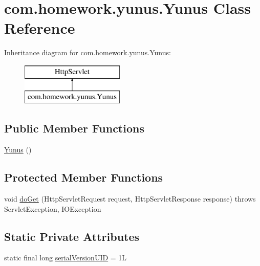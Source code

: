 \hypertarget{classcom_1_1homework_1_1yunus_1_1_yunus}{}\section{com.\+homework.\+yunus.\+Yunus Class Reference}
\label{classcom_1_1homework_1_1yunus_1_1_yunus}
Inheritance diagram for com.\+homework.\+yunus.\+Yunus\+:\begin{figure}[H]
\begin{center}
\leavevmode
\includegraphics[height=2.000000cm]{classcom_1_1homework_1_1yunus_1_1_yunus}
\end{center}
\end{figure}
\subsection*{Public Member Functions}
\begin{DoxyCompactItemize}
\item 
\hyperlink{classcom_1_1homework_1_1yunus_1_1_yunus_a9d5871f9e874380b129c6dff31f1531b}{Yunus} ()
\end{DoxyCompactItemize}
\subsection*{Protected Member Functions}
\begin{DoxyCompactItemize}
\item 
void \hyperlink{classcom_1_1homework_1_1yunus_1_1_yunus_a2653e3f269da80881e2abfa6b30dc708}{do\+Get} (Http\+Servlet\+Request request, Http\+Servlet\+Response response)  throws Servlet\+Exception, I\+O\+Exception 
\end{DoxyCompactItemize}
\subsection*{Static Private Attributes}
\begin{DoxyCompactItemize}
\item 
static final long \hyperlink{classcom_1_1homework_1_1yunus_1_1_yunus_a135ed76b5ead6a58aa5f941be9477ed1}{serial\+Version\+U\+ID} = 1L
\end{DoxyCompactItemize}



